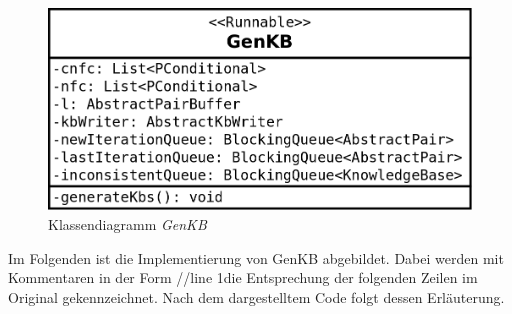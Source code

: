 \documentclass[12pt,a4paper]{article}
\begin{document}
\begin{figure}
\includegraphics[width=0.5\linewidth]{bilder/genkb.png}
\caption{Klassendiagramm \textit{GenKB}}
\label{pic:genkb}
\end{figure}



Im Folgenden ist die Implementierung von GenKB abgebildet. Dabei werden mit Kommentaren in der Form \glqq //line 1\grqq \space die Entsprechung der folgenden Zeilen im Original gekennzeichnet. Nach dem dargestelltem Code folgt dessen Erläuterung. 
\end{document}
